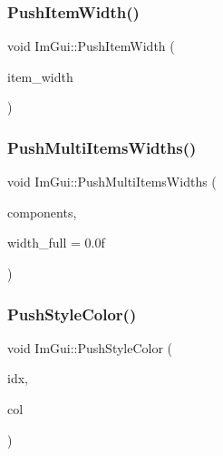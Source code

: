 \subsubsection{\texorpdfstring{Push\+Item\+Width()}{PushItemWidth()}}
{\footnotesize\ttfamily void Im\+Gui\+::\+Push\+Item\+Width (\begin{DoxyParamCaption}\item[{float}]{item\+\_\+width }\end{DoxyParamCaption})}

\hypertarget{namespace_im_gui_ab913605fcf6d405d102cdf56cd414a5a}{}\label{namespace_im_gui_ab913605fcf6d405d102cdf56cd414a5a} 
\subsubsection{\texorpdfstring{Push\+Multi\+Items\+Widths()}{PushMultiItemsWidths()}}
{\footnotesize\ttfamily void Im\+Gui\+::\+Push\+Multi\+Items\+Widths (\begin{DoxyParamCaption}\item[{int}]{components,  }\item[{float}]{width\+\_\+full = {\ttfamily 0.0f} }\end{DoxyParamCaption})}

\hypertarget{namespace_im_gui_a77ee84afb636e05eb4b2d6eeddcc2aa8}{}\label{namespace_im_gui_a77ee84afb636e05eb4b2d6eeddcc2aa8} 
\subsubsection{\texorpdfstring{Push\+Style\+Color()}{PushStyleColor()}\hspace{0.1cm}{\footnotesize\ttfamily [1/2]}}
{\footnotesize\ttfamily void Im\+Gui\+::\+Push\+Style\+Color (\begin{DoxyParamCaption}\item[{Im\+Gui\+Col}]{idx,  }\item[{Im\+U32}]{col }\end{DoxyParamCaption})}

\hypertarget{namespace_im_gui_a5bd052ebf55015312a53739974950e7b}{}\label{namespace_im_gui_a5bd052ebf55015312a53739974950e7b} 

